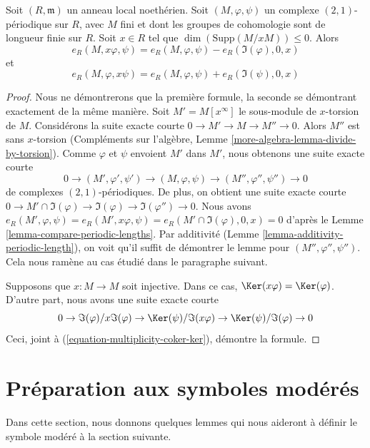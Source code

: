 \begin{lemma}
\label{lemma-multiply-period-length}
Soit $(R, \mathfrak m)$ un anneau local noethérien. Soit
$(M, \varphi, \psi)$ un complexe $(2, 1)$-périodique sur $R$,
avec $M$ fini et dont les groupes de cohomologie sont de longueur finie sur $R$.
Soit $x \in R$ tel que $\dim(\text{Supp}(M/xM)) \leq 0$. Alors
$$
e_R(M, x\varphi, \psi) = e_R(M, \varphi, \psi) - e_R(\Im(\varphi), 0, x)
$$
et
$$
e_R(M, \varphi, x\psi) = e_R(M, \varphi, \psi) + e_R(\Im(\psi), 0, x)
$$
\end{lemma}

\begin{proof}
Nous ne démontrerons que la première formule, la seconde se démontrant
exactement de la même manière.
Soit $M' = M[x^\infty]$ le sous-module de $x$-torsion de $M$.
Considérons la suite exacte courte $0 \to M' \to M \to M'' \to 0$.
Alors $M''$ est sans $x$-torsion (Compléments sur l'algèbre, Lemme
\ref{more-algebra-lemma-divide-by-torsion}).
Comme $\varphi$ et $\psi$ envoient $M'$ dans $M'$,
nous obtenons une suite exacte courte
$$
0 \to (M', \varphi', \psi') \to (M, \varphi, \psi) \to
(M'', \varphi'', \psi'') \to 0
$$
de complexes $(2, 1)$-périodiques. De plus, on obtient une suite exacte courte
$0 \to M' \cap \Im(\varphi) \to \Im(\varphi) \to \Im(\varphi'') \to 0$.
Nous avons
$e_R(M', \varphi, \psi) = e_R(M', x\varphi, \psi) =
e_R(M' \cap \Im(\varphi), 0, x) = 0$
d'après le Lemme \ref{lemma-compare-periodic-lengths}.
Par additivité (Lemme \ref{lemma-additivity-periodic-length}),
on voit qu'il suffit de démontrer le lemme pour $(M'', \varphi'', \psi'')$.
Cela nous ramène au cas étudié dans le paragraphe suivant.

\medskip\noindent
Supposons que $x : M \to M$ soit injective.
Dans ce cas, $\Ker(x\varphi) = \Ker(\varphi)$.
D'autre part, nous avons une suite exacte courte
$$
0 \to \Im(\varphi)/x\Im(\varphi) \to
\Ker(\psi)/\Im(x\varphi) \to \Ker(\psi)/\Im(\varphi) \to 0
$$
Ceci, joint à (\ref{equation-multiplicity-coker-ker}), démontre la formule.
\end{proof}







\section{Préparation aux symboles modérés}
\label{section-preparation-tame-symbol}

\noindent
Dans cette section, nous donnons quelques lemmes qui nous aideront à définir le
symbole modéré à la section suivante.

